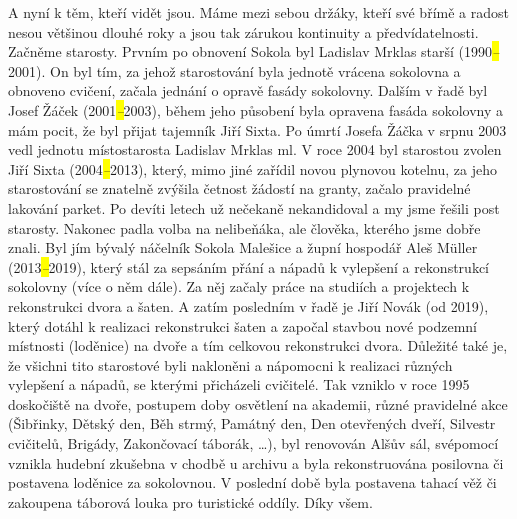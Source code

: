 A nyní k těm, kteří vidět jsou. Máme mezi sebou držáky, kteří své břímě
a radost nesou většinou dlouhé roky a jsou tak zárukou kontinuity a
předvídatelnosti. Začněme starosty. Prvním po obnovení Sokola byl
Ladislav Mrklas starší (1990\emph{\hl{--}}2001). On byl tím, za jehož
starostování byla jednotě vrácena sokolovna a obnoveno cvičení, začala
jednání o opravě fasády sokolovny. Dalším v řadě byl Josef Žáček
(2001\emph{\hl{--}}2003), během jeho působení byla opravena fasáda
sokolovny a mám pocit, že byl přijat tajemník Jiří Sixta. Po úmrtí
Josefa Žáčka v srpnu 2003 vedl jednotu místostarosta Ladislav Mrklas ml.
V roce 2004 byl starostou zvolen Jiří Sixta (2004\emph{\hl{--}}2013),
který, mimo jiné zařídil novou plynovou kotelnu, za jeho starostování se
znatelně zvýšila četnost žádostí na granty, začalo pravidelné lakování
parket. Po devíti letech už nečekaně nekandidoval a my jsme řešili post
starosty. Nakonec padla volba na nelibeňáka, ale člověka, kterého jsme
dobře znali. Byl jím bývalý náčelník Sokola Malešice a župní hospodář
Aleš Müller (2013\emph{\hl{--}}2019), který stál za sepsáním přání a
nápadů k vylepšení a rekonstrukcí sokolovny (více o něm dále). Za něj
začaly práce na studiích a projektech k rekonstrukci dvora a šaten. A
zatím posledním v řadě je Jiří Novák (od 2019), který dotáhl k realizaci
rekonstrukci šaten a započal stavbou nové podzemní místnosti (loděnice)
na dvoře a tím celkovou rekonstrukci dvora. Důležité také je, že všichni
tito starostové byli nakloněni a nápomocni k realizaci různých vylepšení
a nápadů, se kterými přicházeli cvičitelé. Tak vzniklo v roce 1995
doskočiště na dvoře, postupem doby osvětlení na akademii, různé
pravidelné akce (Šibřinky, Dětský den, Běh strmý, Památný den, Den
otevřených dveří, Silvestr cvičitelů, Brigády, Zakončovací táborák,
\ldots), byl renovován Alšův sál, svépomocí vznikla hudební zkušebna v
chodbě u archivu a byla rekonstruována posilovna či postavena loděnice
za sokolovnou. V poslední době byla postavena tahací věž či zakoupena
táborová louka pro turistické oddíly. Díky všem.


